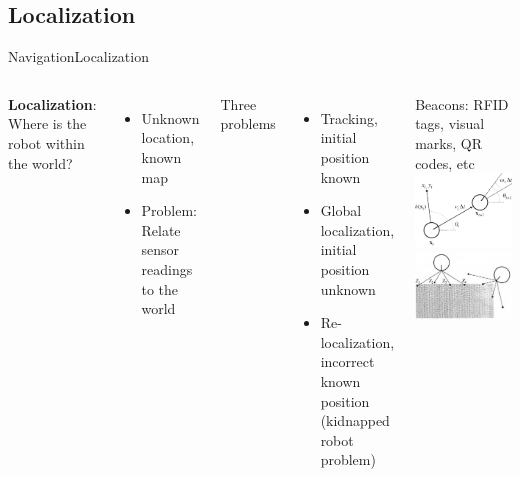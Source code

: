 \documentclass[10pt,compress]{beamer} %
\begin{document}
\subsection{Localization}
\begin{frame}{Navigation}{Localization}
	\begin{columns}
	\textbf{Localization}: Where is the robot within the world?
	\begin{itemize}
		\item Unknown location, known map
		\item Problem: Relate sensor readings to the world
	\end{itemize}
	Three problems
	\begin{itemize}
		\item Tracking, initial position known
		\item Global localization, initial position unknown
		\item Re-localization, incorrect known position (\alert{kidnapped robot} problem)
	\end{itemize}
	Beacons: RFID tags, visual marks, QR codes, etc
		\includegraphics[width=0.9\linewidth]{figs/robotics-pic2.eps}\\
		\includegraphics[width=0.9\linewidth]{figs/sensors-nav.png}
	 \end{columns}
\end{frame}
\end{document}
